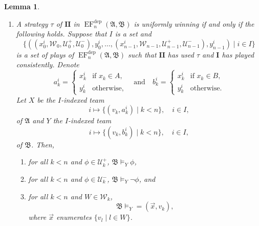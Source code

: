\documentclass[10pt,a4paper]{amsart}
\newtheorem{lemma}[definition]{Lemma}
\newcommand{\playerone}{\mathrm{\mathbf{I}}}
\newcommand{\playertwo}{\mathrm{\mathbf{II}}}
\DeclareMathOperator{\EF}{EF}
\newcommand{\EFdep}{\EF^{\mathrm{dep}}}
\newcommand{\W}{\mathcal W}
\newcommand{\U}{\mathcal U}
\newcommand{\A}{\mathfrak{A}}
\newcommand{\B}{\mathfrak{B}}
\newcommand{\dep}{\mathop{=}}
\begin{document}
\begin{lemma}
\begin{enumerate}
        \item A strategy $\tau$ of $\playertwo$ in $\EFdep_n(\A,\B)$ is uniformly winning if and only if the following holds. Suppose that $I$ is a set and
        \[
            \{ ((x_0^i,\W_0,\U^+_0,\U^-_0),y_0^i,\dots,(x_{n-1}^i,\W_{n-1},\U^+_{n-1},\U^-_{n-1}),y_{n-1}^i) \mid i\in I \}
        \]
        is a set of plays of $\EFdep_n(\A,\B)$ such that $\playertwo$ has used $\tau$ and $\playerone$ has played consistently. Denote
        \[
            a_k^i =
            \begin{cases}
                x_k^i & \text{if $x_k\in A$}, \\
                y_k^i & \text{otherwise},
            \end{cases}
            \quad\text{and}\quad
            b_k^i =
            \begin{cases}
                x_k^i & \text{if $x_k\in B$}, \\
                y_k^i & \text{otherwise}.
            \end{cases}
        \]
        Let $X$ be the $I$-indexed team
        \[
            i\mapsto\{(v_k,a^i_k) \mid k<n\}, \quad i\in I,
        \]
        of $\A$ and $Y$ the $I$-indexed team
        \[
            i\mapsto\{(v_k,b^i_k) \mid k<n\}, \quad i\in I,
        \]
        of $\B$. Then,
        \begin{enumerate}
            \item for all $k<n$ and $\phi\in\U^+_k$, $\B\models_Y\phi$,
            \item for all $k<n$ and $\phi\in\U^-_k$, $\B\models_Y\neg\phi$, and
            \item for all $k<n$ and $W\in\W_k$,
            \[
                \B\models_Y\dep(\vec x,v_k),
            \]
            where $\vec x$ enumerates $\{v_l \mid l\in W\}$.
        \end{enumerate}
    \end{enumerate}
\end{lemma}
\end{document}
